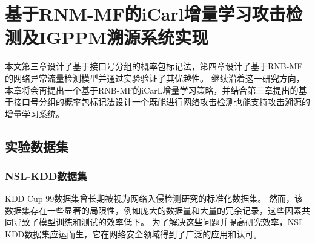 \chapter{基于RNM-MF的iCarl增量学习攻击检测及IGPPM溯源系统实现}
\label{cha:ResNet-BiGRU-IGPPM}



本文第三章设计了基于接口号分组的概率包标记法，第四章设计了基于RNB-MF的网络异常流量检测模型并通过实验验证了其优越性。
继续沿着这一研究方向，本章将会再提出一个基于RNB-MF的iCarL增量学习策略，并结合第三章提出的基于接口号分组的概率包标记法设计一个既能进行网络攻击检测也能支持攻击溯源的增量学习系统。
\section{实验数据集}

\subsection{NSL-KDD数据集\cite{revathi2013detailed}}
KDD Cup 99数据集\cite{tavallaee2009detailed}曾长期被视为网络入侵检测研究的标准化数据集。
然而，该数据集存在一些显著的局限性，例如庞大的数据量和大量的冗余记录，这些因素共同导致了模型训练和测试的效率低下。
为了解决这些问题并提高研究效率，NSL-KDD数据集应运而生，它在网络安全领域得到了广泛的应用和认可。


